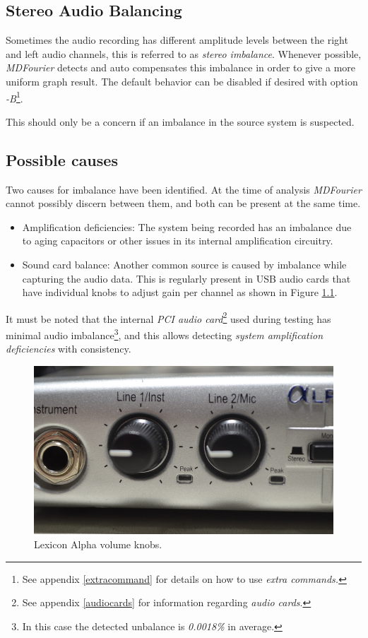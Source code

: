 \documentclass[10pt,a4paper]{report}
\begin{document}
\begin{appendices}
\chapter{Stereo Audio Balancing}
\label{stereobalancing}

Sometimes the audio recording has different amplitude levels between the right and left audio channels, this is referred to as \textit{stereo imbalance}. Whenever possible, \textit{MDFourier} detects and auto compensates this imbalance in order to give a more uniform graph result. The default behavior can be disabled if desired with option \textit{-B}\footnote{See appendix \ref{extracommand} for details on how to use \textit{extra commands.}}.

This should only be a concern if an imbalance in the source system is suspected. 

\section{Possible causes}

Two causes for imbalance have been identified. At the time of analysis \textit{MDFourier} cannot possibly discern between them, and both can be present at the same time. 

\begin{itemize}
	\item Amplification deficiencies: The system being recorded has an imbalance due to aging capacitors or other issues in its internal amplification circuitry.
	\item Sound card balance: Another common source is caused by imbalance while capturing the audio data. This is regularly present in USB audio cards that have individual knobs to adjust gain per channel as shown in Figure \ref{fig:lexiconknobs}.
\end{itemize}

It must be noted that the internal \textit{PCI audio card}\footnote{See appendix \ref{audiocards} for information regarding \textit{audio cards}.} used during testing has minimal audio imbalance\footnote{In this case the detected unbalance is \textit{0.0018\%} in average.}, and this allows detecting \textit{system amplification deficiencies} with consistency.

\begin{figure}[H]
	\centering
	\includegraphics[width=0.8\linewidth]{images/imbalance/lexicon.png}
	\caption[Lexicon knobs]{Lexicon Alpha volume knobs.}
	\label{fig:lexiconknobs}
\end{figure}


\end{appendices}
\end{document}
